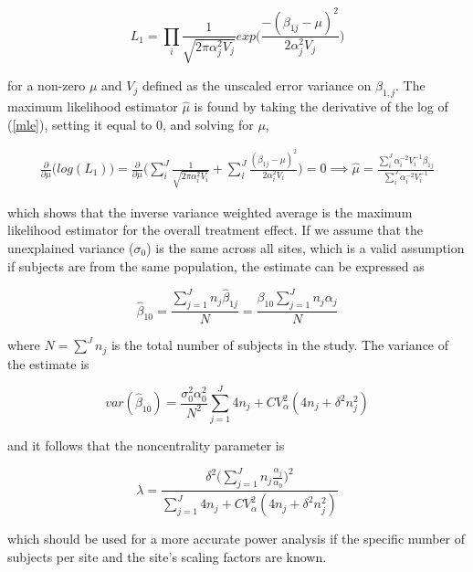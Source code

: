 \begin{equation}
\label{mle}
L_1 = \prod\limits_i\frac{1}{\sqrt{2\pi \alpha_j^2 V_j}}exp\Big(\frac{-(\beta_{1j}- \mu)^2}{2 \alpha_j^2 V_j}\Big)
\end{equation}

for a non-zero $\mu$ and $V_j$ defined as the unscaled error variance on $\hat{\beta_{1,j}}$. The maximum likelihood estimator $\hat{\mu}$ is found by taking the derivative of the log of (\ref{mle}), setting it equal to 0, and solving for $\mu$,

\begin{multline}
\frac{\partial}{\partial \mu}\Big(log(L_1)\Big) =
\frac{\partial}{\partial \mu} \Big(\sum\limits_i^J \frac{1}{\sqrt{2 \pi \alpha_i^2 V_i}} + \sum\limits_i^J \frac{(\beta_{1j} - \mu)^2}{2 \alpha_i^2V_i}\Big) = 0
\implies \hat{\mu} = \frac{\sum\limits_i^J \alpha_i^{-2}V_i^{-1}\beta_{1j}}{\sum\limits_i^J \alpha_i^{-2}V_i^{-1}}
\end{multline}

which shows that the inverse variance weighted average is the maximum likelihood estimator for the overall treatment effect. If we assume that the unexplained variance ($\sigma_0$) is the same across all sites, which is a valid assumption if subjects are from the same population, the estimate can be expressed as

\begin{equation}
\hat{\beta}_{10} = \frac{\sum\limits_{j=1}^J n_j\hat{\beta}_{1j}}{N} = \frac{\beta_{10}\sum\limits_{j=1}^J n_j \alpha_j}{N} 
\end{equation}

where $N = \sum\limits^J n_j$ is the total number of subjects in the study. The variance of the estimate is

\begin{equation}
var(\hat{\beta}_{10}) = \frac{\sigma_0^2 \alpha_0^2}{N^2}\sum\limits_{j=1}^J 4n_j + CV_{\alpha}^2(4n_j + \delta^2n_j^2) 
\end{equation}

and it follows that the noncentrality parameter is

\begin{equation}
\label{weightedlambda}
\lambda = \frac{\delta^2 \Big(\sum\limits_{j=1}^J n_j \frac{\alpha_j}{\alpha_0}\Big)^2 }{\sum\limits_{j=1}^J 4n_j + CV_{\alpha}^2(4n_j + \delta^2n_j^2)}
\end{equation}

which should be used for a more accurate power analysis if the specific number of subjects per site and the site's scaling factors are known.


